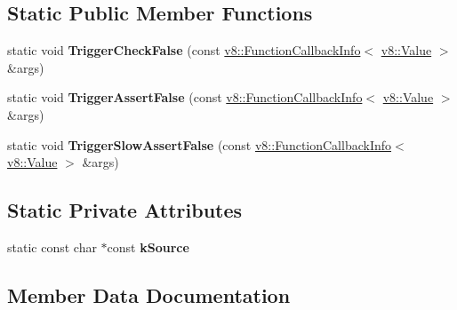 \subsection*{Static Public Member Functions}
\begin{DoxyCompactItemize}
\item 
static void {\bfseries Trigger\+Check\+False} (const \hyperlink{classv8_1_1_function_callback_info}{v8\+::\+Function\+Callback\+Info}$<$ \hyperlink{classv8_1_1_value}{v8\+::\+Value} $>$ \&args)\hypertarget{classv8_1_1internal_1_1_trigger_failure_extension_a713f90a95ae17c510df51cb3b70fd4f0}{}\label{classv8_1_1internal_1_1_trigger_failure_extension_a713f90a95ae17c510df51cb3b70fd4f0}

\item 
static void {\bfseries Trigger\+Assert\+False} (const \hyperlink{classv8_1_1_function_callback_info}{v8\+::\+Function\+Callback\+Info}$<$ \hyperlink{classv8_1_1_value}{v8\+::\+Value} $>$ \&args)\hypertarget{classv8_1_1internal_1_1_trigger_failure_extension_aada744e2dfb388e5676111344d728547}{}\label{classv8_1_1internal_1_1_trigger_failure_extension_aada744e2dfb388e5676111344d728547}

\item 
static void {\bfseries Trigger\+Slow\+Assert\+False} (const \hyperlink{classv8_1_1_function_callback_info}{v8\+::\+Function\+Callback\+Info}$<$ \hyperlink{classv8_1_1_value}{v8\+::\+Value} $>$ \&args)\hypertarget{classv8_1_1internal_1_1_trigger_failure_extension_aadadd0a65000877c4b8b861b931e473b}{}\label{classv8_1_1internal_1_1_trigger_failure_extension_aadadd0a65000877c4b8b861b931e473b}

\end{DoxyCompactItemize}
\subsection*{Static Private Attributes}
\begin{DoxyCompactItemize}
\item 
static const char $\ast$const {\bfseries k\+Source}
\end{DoxyCompactItemize}


\subsection{Member Data Documentation}
